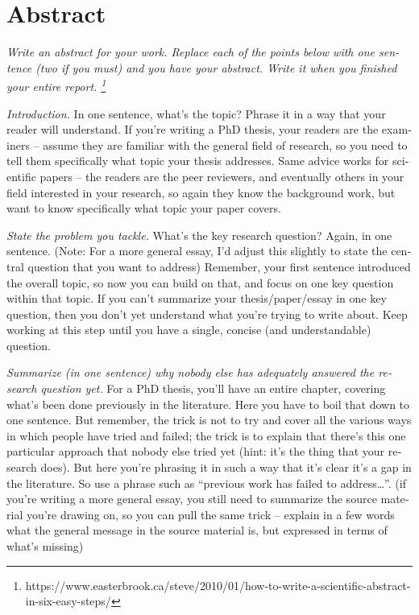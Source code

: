 \documentclass[
  fontsize=10pt,
  numbers=noenddot,
  english,  %
  paper=a5,
  twoside,  %
  DIV=calc,
  headings=small,
  bibliography=totoc,
  listof=totoc,
  draft=false
]{scrbook}
\theoremstyle{break}
\begin{document}
\chapter*{Abstract}
\begin{otherlanguage}{american}
  \emph{Write an abstract for your work.
    Replace each of the points below with one sentence (two if you must) and you have your abstract.
    Write it when you finished your entire report.
    \footnote{https://www.easterbrook.ca/steve/2010/01/how-to-write-a-scientific-abstract-in-six-easy-steps/}}

  \emph{Introduction.}
  In one sentence, what’s the topic?
  Phrase it in a way that your reader will understand.
  If you’re writing a PhD thesis, your readers are the examiners – assume they are familiar with the general field of research, so you need to tell them specifically what topic your thesis addresses.
  Same advice works for scientific papers – the readers are the peer reviewers, and eventually others in your field interested in your research, so again they know the background work, but want to know specifically what topic your paper covers.

  \emph{State the problem you tackle.}
  What’s the key research question?
  Again, in one sentence.
  (Note: For a more general essay, I’d adjust this slightly to state the central question that you want to address)
  Remember, your first sentence introduced the overall topic, so now you can build on that, and focus on one key question within that topic.
  If you can’t summarize your thesis/paper/essay in one key question, then you don’t yet understand what you’re trying to write about.
  Keep working at this step until you have a single, concise (and understandable) question.

  \emph{Summarize (in one sentence) why nobody else has adequately answered the research question yet.}
  For a PhD thesis, you’ll have an entire chapter, covering what’s been done previously in the literature.
  Here you have to boil that down to one sentence.
  But remember, the trick is not to try and cover all the various ways in which people have tried and failed; the trick is to explain that there’s this one particular approach that nobody else tried yet (hint: it’s the thing that your research does).
  But here you’re phrasing it in such a way that it’s clear it’s a gap in the literature.
  So use a phrase such as “previous work has failed to address…”.
  (if you’re writing a more general essay, you still need to summarize the source material you’re drawing on, so you can pull the same trick – explain in a few words what the general message in the source material is, but expressed in terms of what’s missing)


\end{otherlanguage}
\end{document}
